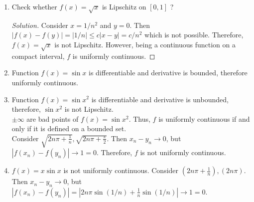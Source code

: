 \begin{enumerate}
\begin{proof}[Solution]
		When the domain of $f(x)=x^2$ is bounded, then both end point limits exists and $f(x)$ is continuous everywhere. Therefore $f(x)=x^2$ is uniformly continuous on every bounded set.
	\end{proof}
	\item Check whether $f(x) = \sqrt{x}$ is Lipschitz on $[0,1]$ ?
	\begin{proof}[Solution]
		Consider $x = 1/n^2$ and $y = 0$. Then $|f(x)-f(y)| = |1/n| \le c|x-y| = c/n^2$ which is not possible.
		Therefore, $f(x) = \sqrt{x}$ is not Lipschitz. However, being a continuous function on a compact interval, $f$ is uniformly continuous.
	\end{proof}
	\item Function $f(x) = \sin x$ is differentiable and derivative is bounded, therefore uniformly continuous.
	\item Function $f(x) = \sin x^2$ is differentiable and derivative is unbounded, therefore, $\sin x^2$ is not Lipschitz.\\

	$\pm \infty$ are bad points of $f(x) = \sin x^2$. Thus, $f$ is uniformly continuous if and only if it is defined on a bounded set.\\

	Consider $\sqrt{2n\pi+\frac{1}{n}}, \sqrt{2n\pi+\frac{\pi}{2}}$. Then $x_n - y_n \to 0$, but $|f(x_n) - f(y_n)| \to 1 = 0$. Therefore, $f$ is not uniformly continuous.
	\item $f(x) = x\sin x$ is not uniformly continuous.
		Consider $(2n\pi+\frac{1}{n}), (2n\pi)$. Then $x_n - y_n \to 0$, but $|f(x_n) - f(y_n)| = |2n\pi\sin (1/n) + \frac{1}{n} \sin (1/n)| \to 1 = 0$.


\end{enumerate}
